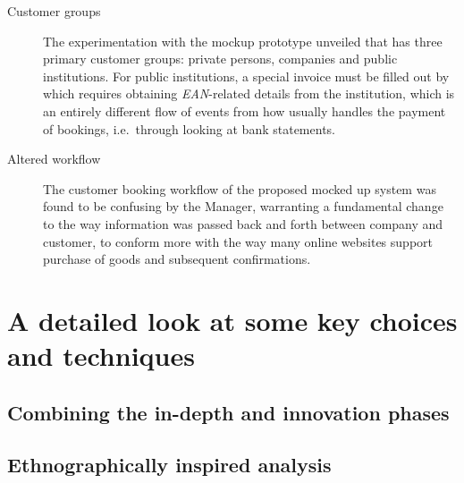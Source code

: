 \begin{description}
    \item [Customer groups] The experimentation with the mockup prototype unveiled that 
        \gomonkey{} has three primary customer groups: private persons, companies and public
        institutions. For public institutions, a special invoice must be filled
        out by \gomonkey{} which requires obtaining \textit{EAN}-related details
        from the institution, which is an entirely different flow of events from
        how \gomonkey{} usually handles the payment of bookings, i.e.\ through
        looking at bank statements. 
    \item [Altered workflow] The customer booking workflow of the proposed mocked up 
        system was found to be confusing by the Manager, warranting a fundamental change 
        to the way information was passed back and forth between company and customer, 
        to conform more with the way many online websites support purchase of goods and 
        subsequent confirmations.
\end{description}

\section{A detailed look at some key choices and techniques} \label{sec:detailed}
\subsection{Combining the in-depth and innovation phases}

% 

\subsection{Ethnographically inspired analysis}


